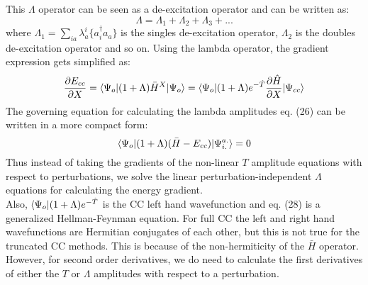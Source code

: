 This $\Lambda$ operator can be seen as a de-excitation operator and can be written as:
\begin{equation}
\Lambda = \Lambda_1 + \Lambda_2 + \Lambda_3 + ...
\end{equation} 
where $\Lambda_1 = \sum_{ia}\lambda^i_a\{{a}^\dagger_i a_a\}$ is the singles de-excitation
operator, $\Lambda_2$ is the doubles de-excitation operator and so on.  
Using the lambda operator, the gradient expression gets simplified as:
\begin{equation}
\frac{\partial{E_{cc}}}{\partial X} = \langle \Psi_o |(1 + \Lambda){\bar{H}}^X| \Psi_o \rangle = \langle \Psi_o |(1 + \Lambda)e^{-\hat{T}}\frac{\partial{\hat H}}{\partial X}| \Psi_{cc} \rangle
\end{equation}
The governing equation for calculating the lambda amplitudes eq. (26) can be written
in a more compact form:
\begin{equation}
\langle \Psi_o |(1 + \Lambda)(\bar{H} - E_{cc})| {\Psi}^{a.}_{i.} \rangle = 0
\end{equation}
Thus instead of taking the gradients of the non-linear $T$ amplitude
equations with respect to perturbations, we solve the linear perturbation-independent 
$\Lambda$ equations for calculating the energy gradient.\\
Also, $\langle \Psi_o |(1 + \Lambda)e^{-\hat{T}}$ is the CC left hand wavefunction and 
eq. (28) is a generalized Hellman-Feynman equation\cite{Feynman39}. For full CC the left and 
right hand wavefunctions are Hermitian conjugates of each other, but this is not true for 
the truncated CC methods. This is because of the non-hermiticity of the $\bar{H}$ operator.
However, for second order derivatives, we do need to calculate the first derivatives of 
either the $T$ or $\Lambda$ amplitudes with respect to a perturbation.

